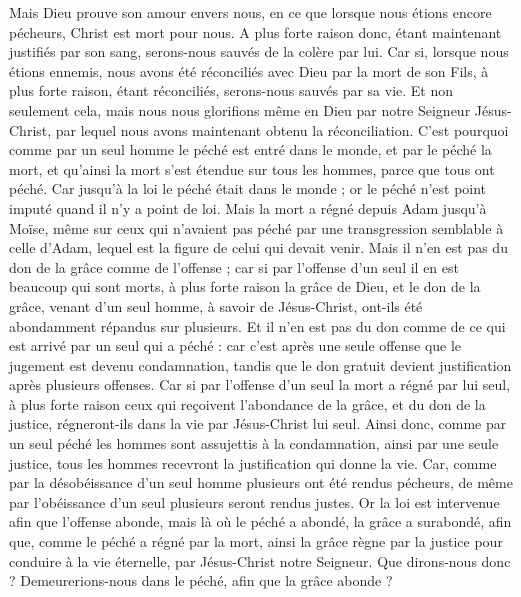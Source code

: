 \begin{multicols}{2}
Mais Dieu prouve son amour envers nous, en ce que lorsque nous étions encore pécheurs, Christ est mort pour nous.
A plus forte raison donc, étant maintenant justifiés par son sang, serons-nous sauvés de la colère par lui.
Car si, lorsque nous étions ennemis, nous avons été réconciliés avec Dieu par la mort de son Fils, à plus forte raison, étant réconciliés, serons-nous sauvés par sa vie.
Et non seulement cela, mais nous nous glorifions même en Dieu par notre Seigneur Jésus-Christ, par lequel nous avons maintenant obtenu la réconciliation.
C'est pourquoi comme par un seul homme le péché est entré dans le monde, et par le péché la mort, et qu’ainsi la mort s’est étendue sur tous les hommes, parce que tous ont péché.
Car jusqu'à la loi le péché était dans le monde ; or le péché n'est point imputé quand il n'y a point de loi.
Mais la mort a régné depuis Adam jusqu'à Moïse, même sur ceux qui n'avaient pas péché par une transgression semblable à celle d’Adam, lequel est la figure de celui qui devait venir.
Mais il n'en est pas du don de la grâce comme de l'offense ; car si par l'offense d'un seul il en est beaucoup qui sont morts, à plus forte raison la grâce de Dieu, et le don de la grâce, venant d'un seul homme, à savoir de Jésus-Christ, ont-ils été abondamment répandus sur plusieurs.
Et il n’en est pas du don comme de ce qui est arrivé par un seul qui a péché : car c'est après une seule offense que le jugement est devenu condamnation, tandis que le don gratuit devient justification après plusieurs offenses.
Car si par l'offense d'un seul la mort a régné par lui seul, à plus forte raison ceux qui reçoivent l'abondance de la grâce, et du don de la justice, régneront-ils dans la vie par Jésus-Christ lui seul.
Ainsi donc, comme par un seul péché les hommes sont assujettis à la condamnation, ainsi par une seule justice, tous les hommes recevront la justification qui donne la vie.
Car, comme par la désobéissance d'un seul homme plusieurs ont été rendus pécheurs, de même par l'obéissance d'un seul plusieurs seront rendus justes.
Or la loi est intervenue afin que l'offense abonde, mais là où le péché a abondé, la grâce a surabondé,
afin que, comme le péché a régné par la mort, ainsi la grâce règne par la justice pour conduire à la vie éternelle, par Jésus-Christ notre Seigneur.
\VerseOne{}Que dirons-nous donc ? Demeurerions-nous dans le péché, afin que la grâce abonde ?

\end{multicols}

